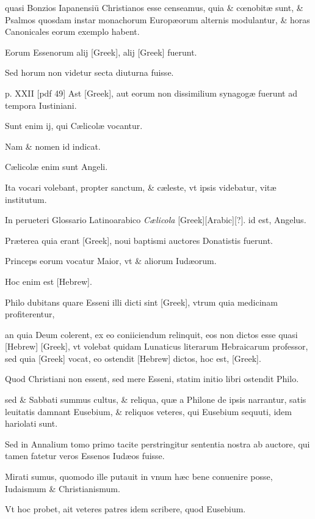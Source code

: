 \begin{parnumbers}
quasi Bonzios
Iapanensiū Christianos esse censeamus, quia \& cœnobitæ sunt,
\& Psalmos quosdam instar monachorum Europæorum alternis modulantur,
\& horas Canonicales eorum exemplo habent.

Eorum Essenorum alij \textgreek{[Greek]}, alij \textgreek{[Greek]} fuerunt.

Sed horum non videtur
secta diuturna fuisse.

\clearpage
p. XXII [pdf 49]
Ast \textgreek{[Greek]}, aut eorum non dissimilium
synagogæ fuerunt ad tempora Iustiniani.

Sunt enim ij, qui Cælicolæ
vocantur.

Nam \& nomen id indicat.

Cælicolæ enim sunt
Angeli.

Ita vocari volebant, propter sanctum, \& cæleste, vt ipsis videbatur,
vitæ institutum.

In perueteri Glossario Latinoarabico \textit{Cælicola}
[Greek][Arabic][?]. id est, Angelus.

Præterea quia erant \textgreek{[Greek]}, noui
baptismi auctores Donatistis fuerunt.

Princeps eorum vocatur
Maior, vt \& aliorum Iudæorum.

Hoc enim est \texthebrew{[Hebrew]}.

Philo dubitans
quare Esseni illi dicti sint \textgreek{[Greek]},
 vtrum quia medicinam profiterentur,

an quia Deum colerent, ex eo coniiciendum relinquit,
eos non dictos esse quasi \texthebrew{[Hebrew]} \textgreek{[Greek]},
 vt volebat quidam Lunaticus
literarum Hebraicarum professor, sed quia \textgreek{[Greek]} vocat, eo ostendit
\texthebrew{[Hebrew]} dictos, hoc est, \textgreek{[Greek]}.

Quod Christiani non essent, sed
mere Esseni, statim initio libri ostendit Philo.

sed \& Sabbati summus
cultus, \& reliqua, quæ a Philone de ipsis narrantur, satis leuitatis
damnant Eusebium, \& reliquos veteres, qui Eusebium sequuti,
idem hariolati sunt.

Sed in Annalium tomo primo tacite perstringitur
sententia nostra ab auctore, qui tamen fatetur veros Essenos Iudæos
fuisse.

Mirati sumus, quomodo ille putauit in vnum hæc bene
conuenire posse, Iudaismum \& Christianismum.

Vt hoc probet, ait
veteres patres idem scribere, quod Eusebium.


\end{parnumbers}
